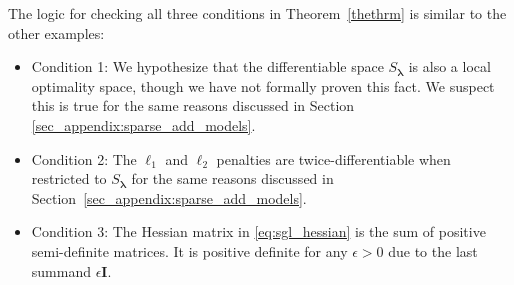 \documentclass[12pt,letterpaper]{article}
\begin{document}
The logic for checking all three conditions in Theorem~\ref{thethrm} is similar to the other examples:
\begin{itemize}
	\item[] Condition 1: We hypothesize that the differentiable space $S_{\boldsymbol{\lambda}}$ is also a local optimality space, though we have not formally proven this fact. We suspect this is true for the same reasons discussed in Section \ref{sec_appendix:sparse_add_models}.
	\item[] Condition 2: The $\ell_1$ and $\ell_2$ penalties are twice-differentiable when restricted to $S_{\boldsymbol{\lambda}}$ for the same reasons discussed in Section~\ref{sec_appendix:sparse_add_models}. \hfill {}
	\item[] Condition 3: The Hessian matrix in \eqref{eq:sgl_hessian} is the sum of positive semi-definite matrices. It is positive definite for any $\epsilon > 0$ due to the last summand $\epsilon \boldsymbol{I}$. \hfill {}
\end{itemize}
\end{document}

